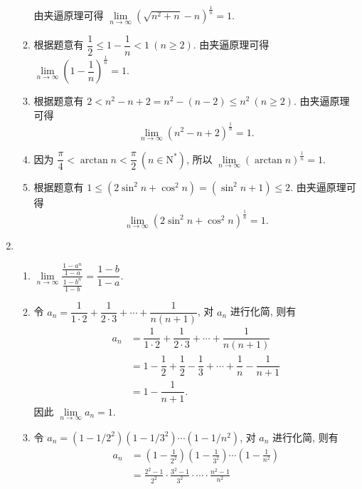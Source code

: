 \begin{enumerate}
\begin{enumerate}[(1)]
                由夹逼原理可得 $\lim\limits_{n\to\infty}(\sqrt{n^2 + n} - n)^{\frac 1n} = 1$.
            \item 
                根据题意有 $\dfrac 12 \leqslant 1 - \dfrac 1n < 1\ (n \geqslant 2)$.
                由夹逼原理可得 $\lim\limits_{n\to\infty}\left(1 - \dfrac 1n\right)^{\frac 1n} = 1$.
            \item 
                根据题意有 $2 < n^2 - n + 2 = n^2 - (n - 2) \leqslant n^2\ (n \geqslant 2)$.
                由夹逼原理可得 \[\lim\limits_{n\to\infty}(n^2 - n + 2)^{\frac 1n} = 1.\]
            \item 
                因为 $\dfrac{\pi}{4} < \arctan n < \dfrac{\pi}{2}\ (n\in\mathrm{N}^*)$, 所以 $\lim\limits_{n\to\infty}(\arctan n)^{\frac{1}{n}} = 1$.
            \item 
                根据题意有 $1 \leqslant (2\sin^2n + \cos^2n) = (\sin^2n + 1) \leqslant 2$.
                由夹逼原理可得 \[\lim\limits_{n\to\infty}(2\sin^2n + \cos^2n)^{\frac{1}{n}} = 1.\]
        \end{enumerate}
    \item
        \begin{enumerate}[(1)]
            \item 
                $\lim\limits_{n\to\infty}\dfrac{\frac{1-a^n}{1-a}}{\frac{1-b^n}{1-b}} = \dfrac{1-b}{1-a}$.
            \item 
                令 $a_n = \dfrac{1}{1\cdot2} + \dfrac{1}{2\cdot3} + \cdots + \dfrac{1}{n\left(n+1\right)}$, 对 $a_n$ 进行化简, 则有
                \begin{align*}
                    a_n &= \dfrac{1}{1\cdot2} + \dfrac{1}{2\cdot3} + \cdots + \dfrac{1}{n\left(n+1\right)} \\
                        &= 1 - \dfrac 12 + \dfrac 12 - \dfrac 13 + \cdots + \dfrac 1n - \dfrac{1}{n+1} \\
                        &= 1 - \dfrac{1}{n+1}.
                \end{align*}
                因此 $\lim\limits_{n\to\infty}a_n = 1$.
            \item
                令 $a_n = (1-1/2^2)(1-1/3^2)\cdots(1-1/n^2)$, 对 $a_n$ 进行化简, 则有
                \begin{align*}
                    a_n &= \left(1-\frac{1}{2^2}\right)\left(1-\frac{1}{3^2}\right)\cdots\left(1-\frac{1}{n^2}\right) \\
                        &= \frac{2^2-1}{2^2} \cdot \frac{3^2-1}{3^2} \cdot \cdots \cdot \frac{n^2-1}{n^2} \\

\end{align*}
\end{enumerate}
\end{enumerate}
